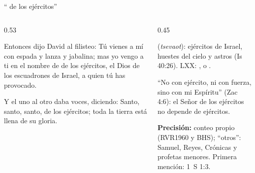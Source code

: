 \begin{frame}{``\SENOR{} de los ejércitos''}
\begin{columns}[t,onlytextwidth]
\begin{column}{0.53\textwidth}
\begin{center}\scriptsize{}\end{center}
\begin{cita}[fontupper=\scriptsize\itshape]Entonces dijo David al filisteo: Tú vienes a mí con espada y lanza y jabalina; mas yo vengo a ti en el nombre de \SENOR{} de los ejércitos, el Dios de los escuadrones de Israel, a quien tú has provocado.\end{cita}
\begin{cita}[fontupper=\scriptsize\itshape]Y el uno al otro daba voces, diciendo: Santo, santo, santo, \SENOR{} de los ejércitos; toda la tierra está llena de su gloria.\end{cita}
\end{column}
\begin{column}{0.45\textwidth}
\centering
{}\par\smallskip
\scriptsize {} (\emph{tsevaot}): ejércitos de Israel, huestes del cielo y astros (Is 40:26). LXX: ,  o .\par\smallskip
``No con ejército, ni con fuerza, sino con mi Espíritu'' (Zac 4:6): el Señor de los ejércitos no depende de ejércitos.\par\smallskip
{\fontsize{6}{7}\selectfont\color{gris}\textbf{Precisión:} conteo propio (RVR1960 y BHS); ``otros'': Samuel, Reyes, Crónicas y profetas menores. Primera mención: 1~S 1:3.\par}
\end{column}
\end{columns}
\end{frame}

